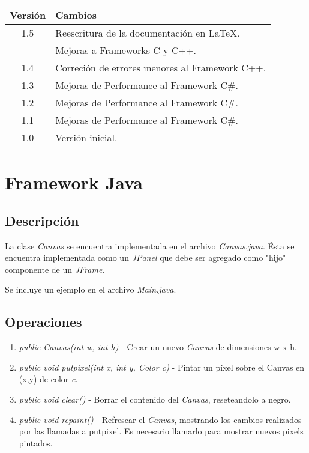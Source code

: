 \documentclass[11pt]{amsart}
\begin{document}
\begin{center}
	\begin{tabular}{ | c | p{12cm} | }
	\hline
	Versi\'on & Cambios \\ \hline
	1.5 & Reescritura de la documentaci\'on en \LaTeX. \\ & Mejoras a Frameworks C y C++.\\
	1.4 & Correci\'on de errores menores al Framework C++. \\
	1.3 & Mejoras de Performance al Framework C\#. \\
	1.2 & Mejoras de Performance al Framework C\#. \\
	1.1 & Mejoras de Performance al Framework C\#. \\
	1.0 & Versi\'on inicial. \\ \hline	
	\end{tabular}
\end{center}

\section{Framework Java}

\subsection{Descripci\'on}
La clase \emph{Canvas} se encuentra implementada en el archivo \emph{Canvas.java}. \'Esta se encuentra implementada como un \emph{JPanel} que debe ser agregado como "hijo" componente de un \emph{JFrame}.

Se incluye un ejemplo en el archivo \emph{Main.java}.

\subsection{Operaciones}
\begin{enumerate}
	\item \emph{public Canvas(int w, int h)} - Crear un nuevo \emph{Canvas} de dimensiones w x h.
	\item \emph{public void putpixel(int x, int y, Color c)} - Pintar un p\'ixel sobre el Canvas en (x,y) de color \emph{c}.
	\item \emph{public void clear()} - Borrar el contenido del \emph{Canvas}, reseteandolo a negro.
	\item \emph{public void repaint()} - Refrescar el \emph{Canvas}, mostrando los cambios realizados por las llamadas a putpixel. Es necesario llamarlo para mostrar nuevos pixels pintados.
\end{enumerate}
\end{document}
